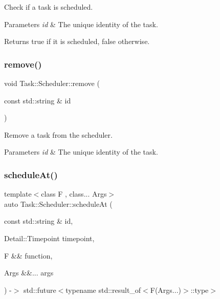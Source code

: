 Check if a task is scheduled. 
\begin{DoxyParams}{Parameters}
{\em id} & The unique identity of the task. \\
\hline
\end{DoxyParams}
\begin{DoxyReturn}{Returns}
{\ttfamily true} if it is scheduled, {\ttfamily false} otherwise. 
\end{DoxyReturn}
\mbox{\label{classTask_1_1Scheduler_a054abc32dfe84571e2591cee11de2ab1}} 
\subsubsection{\texorpdfstring{remove()}{remove()}}
{\footnotesize\ttfamily void Task\+::\+Scheduler\+::remove (\begin{DoxyParamCaption}\item[{const std\+::string \&}]{id }\end{DoxyParamCaption})}

Remove a task from the scheduler. 
\begin{DoxyParams}{Parameters}
{\em id} & The unique identity of the task. \\
\hline
\end{DoxyParams}
\mbox{\label{classTask_1_1Scheduler_a02811a81c637db4cf27261c58e1a7060}} 
\subsubsection{\texorpdfstring{schedule\+At()}{scheduleAt()}}
{\footnotesize\ttfamily template$<$class F , class... Args$>$ \\
auto Task\+::\+Scheduler\+::schedule\+At (\begin{DoxyParamCaption}\item[{const std\+::string \&}]{id,  }\item[{Detail\+::\+Timepoint}]{timepoint,  }\item[{F \&\&}]{function,  }\item[{Args \&\&...}]{args }\end{DoxyParamCaption}) -\/$>$ std\+::future$<$typename std\+::result\+\_\+of$<$F(Args...)$>$\+::type$>$ \hspace{0.3cm}{\ttfamily [inline]}}

